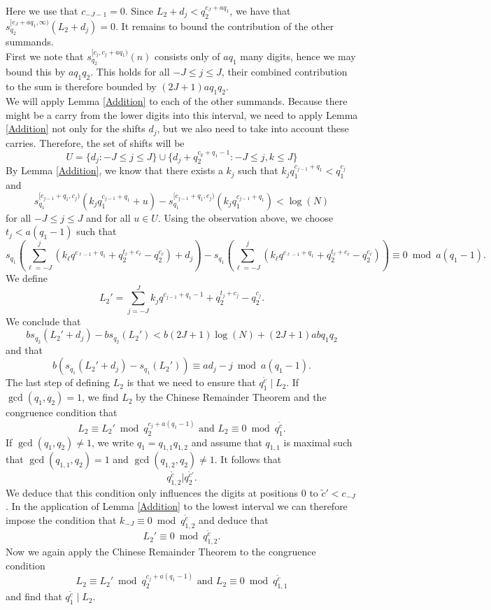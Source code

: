 \documentclass[12pt]{amsart}
\renewcommand{\leq}{\leqslant}
\theoremstyle{definition}
\numberwithin{equation}{section}
\numberwithin{equation}{section}
\begin{document}
Here we use that $c_{-J-1}=0$. Since $L_2+d_j< q_2^{c_J+aq_1}$, we have that $s_{q_2}^{[c_J+aq_1, \infty)}(L_2+d_j)=0$. It remains to bound the contribution of the other summands.\\

First we note that $s_{q_2}^{[c_{j}, c_j+aq_1)}(n)$ consists only of $aq_1$ many digits, hence we may bound this by $aq_1q_2$. This holds for all $-J\leq j\leq J$, their combined contribution to the sum is therefore bounded by $(2J+1)aq_1q_2$.\\

We will apply Lemma \ref{Addition} to each of the other summands. Because there might be a carry from the lower digits into this interval, we need to apply Lemma \ref{Addition} not only for the shifts $d_j$, but we also need to take into account these carries. Therefore, the set of shifts will be
\[
	U=\{d_j: -J\leq j\leq J\} \cup \{d_j+q_2^{c_k+q_1-1}:-J\leq j,k\leq J\}
\]
By Lemma \ref{Addition}, we know that there exists a $k_{j}$ such that $k_jq_1^{c_{j-1}+q_1}<q_1^{c_j}$ and
\[
	s_{q_1}^{[c_{j-1}+q_1, c_j)}(k_{j}q_1^{c_{j-1}+q_1}+u)-	s_{q_1}^{[c_{j-1}+q_1, c_j)}(k_{j}q_1^{c_{j-1}+q_1})<\log(N)
\]
for all $-J\leq j \leq J$ and for all $u\in U$. Using the observation above, we choose $t_{j}<a(q_1-1)$ such that
\[
	s_{q_1}\left(\sum_{\ell=-J}^{j}\left(k_{\ell}q^{c_{\ell-1}+q_1}+ q_2^{t_{\ell}+c_{\ell}}-q_2^{c_{\ell}}\right)+d_j\right)-	s_{q_1}\left(\sum_{\ell=-J}^{j}\left(k_{\ell}q^{c_{\ell-1}+q_1}+ q_2^{t_{\ell}+c_{\ell}}-q_2^{c_{\ell}}\right)\right)\equiv 0 \bmod a(q_1-1).
\]
We define
\[
	L_2' = \sum_{j=-J}^{J}k_jq^{c_{j-1}+q_1-1}+ q_2^{t_j+c_j}-q_2^{c_j}.
\]
We conclude that
\[
	bs_{q_2}(L_2'+d_j)-bs_{q_2}(L_2') < b(2J+1)\log(N) + (2J+1)abq_1q_2
\]
and that
\[
	b\left(s_{q_1}\left(L_2'+d_j\right)-s_{q_1}\left(L_2'\right)\right)\equiv ad_j-j \bmod a(q_1-1).
\]
The last step of defining $L_2$ is that we need to ensure that $q_1^{\tilde{c}}\mid L_2$. If $\gcd(q_1,q_2)=1$, we find $L_2$ by the Chinese Remainder Theorem and the congruence condition that
\[
	L_2 \equiv L_2' \bmod q_2^{c_j+a(q_1-1)} \text{ and } L_2 \equiv 0 \bmod q_1^{\tilde{c}}.
\]
If $\gcd(q_1,q_2)\neq 1$, we write $q_1 = q_{1,1}q_{1,2}$ and assume that $q_{1,1}$ is maximal such that $\gcd(q_{1,1},q_2)=1$ and $\gcd(q_{1,2},q_2) \neq 1$. It follows that 
\[
	q_{1,2}^{\tilde{c}}|q_2^{\tilde{c}'}.
\] 
We deduce that this condition only influences the digits at positions $0$ to $\tilde{c}'<c_{-J}$. In the application of Lemma \ref{Addition} to the lowest interval we can therefore impose the condition that $k_{-J} \equiv 0 \bmod q_{1,2}^{\tilde{c}}$ and deduce that
\[
	L_2' \equiv 0 \bmod q_{1,2}^{\tilde{c}}.
\]
Now we again apply the Chinese Remainder Theorem to the congruence condition
\[
	L_2 \equiv L_2' \bmod q_2^{c_j+a(q_1-1)} \text{ and } L_2 \equiv 0 \bmod q_{1,1}^{\tilde{c}}
\]
and find that $q_1^{\tilde{c}}\mid L_2$.\\
\end{document}
